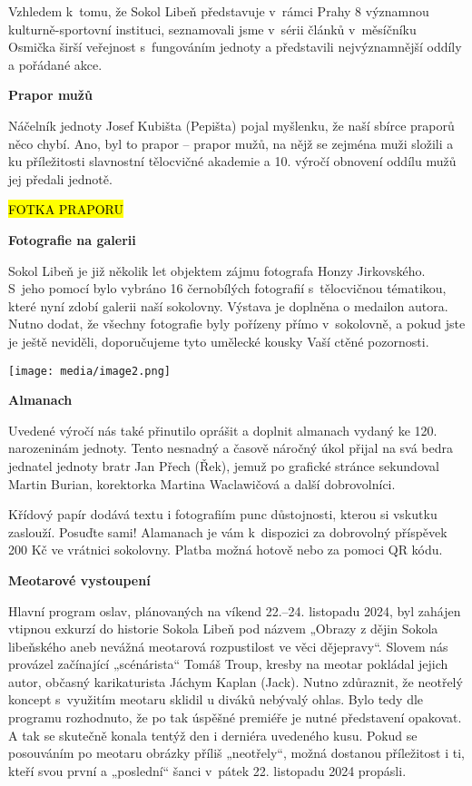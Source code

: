 Vzhledem k~tomu, že Sokol Libeň představuje v~rámci Prahy 8 významnou
kulturně-sportovní instituci, seznamovali jsme v~sérii článků
v~měsíčníku Osmička širší veřejnost s~fungováním jednoty a představili
nejvýznamnější oddíly a pořádané akce.

\textbf{Prapor mužů}

Náčelník jednoty Josef Kubišta (Pepišta) pojal myšlenku, že naší sbírce
praporů něco chybí. Ano, byl to prapor -- prapor mužů, na nějž se
zejména muži složili a ku příležitosti slavnostní tělocvičné akademie a
10. výročí obnovení oddílu mužů jej předali jednotě.

\hl{FOTKA PRAPORU}

\textbf{Fotografie na galerii}

Sokol Libeň je již několik let objektem zájmu fotografa Honzy
Jirkovského. S~jeho pomocí bylo vybráno 16 černobílých fotografií
s~tělocvičnou tématikou, které nyní zdobí galerii naší sokolovny.
Výstava je doplněna o medailon autora. Nutno dodat, že všechny
fotografie byly pořízeny přímo v~sokolovně, a pokud jste je ještě
neviděli, doporučujeme tyto umělecké kousky Vaší ctěné pozornosti.

\texttt{[image: media/image2.png]}

\textbf{Almanach}

Uvedené výročí nás také přinutilo oprášit a doplnit almanach vydaný ke
120. narozeninám jednoty. Tento nesnadný a časově náročný úkol přijal na
svá bedra jednatel jednoty bratr Jan Přech (Řek), jemuž po grafické
stránce sekundoval Martin Burian, korektorka Martina Waclawičová a další
dobrovolníci.

Křídový papír dodává textu i fotografiím punc důstojnosti, kterou si
vskutku zaslouží. Posuďte sami! Alamanach je vám k~dispozici za
dobrovolný příspěvek 200 Kč ve vrátnici sokolovny. Platba možná hotově
nebo za pomoci QR kódu.

\textbf{Meotarové vystoupení}

Hlavní program oslav, plánovaných na víkend 22.--24. listopadu 2024, byl
zahájen vtipnou exkurzí do historie Sokola Libeň pod názvem „Obrazy z
dějin Sokola libeňského aneb nevážná meotarová rozpustilost ve věci
dějepravy``. Slovem nás provázel začínající „scénárista`` Tomáš Troup,
kresby na meotar pokládal jejich autor, občasný karikaturista Jáchym
Kaplan (Jack). Nutno zdůraznit, že neotřelý koncept s~využitím meotaru
sklidil u diváků nebývalý ohlas. Bylo tedy dle programu rozhodnuto, že
po tak úspěšné premiéře je nutné představení opakovat. A tak se skutečně
konala tentýž den i derniéra uvedeného kusu. Pokud se posouváním po
meotaru obrázky příliš „neotřely``, možná dostanou příležitost i ti,
kteří svou první a „poslední`` šanci v~pátek 22. listopadu 2024
propásli.

